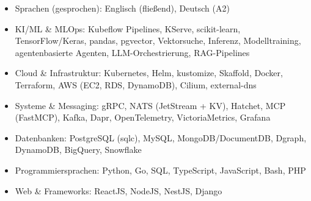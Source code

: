 \documentclass[10pt,a4paper]{resume}
\begin{document}
\begin{itemize}[leftmargin=1.4em,nosep,topsep=2pt]
  \item Sprachen (gesprochen): Englisch (fließend), Deutsch (A2)
  \item KI/ML \& MLOps: Kubeflow Pipelines, KServe, scikit-learn, TensorFlow/Keras, pandas, pgvector, Vektorsuche, Inferenz, Modelltraining, agentenbasierte Agenten, LLM-Orchestrierung, RAG-Pipelines
  \item Cloud \& Infrastruktur: Kubernetes, Helm, kustomize, Skaffold, Docker, Terraform, AWS (EC2, RDS, DynamoDB), Cilium, external-dns
  \item Systeme \& Messaging: gRPC, NATS (JetStream + KV), Hatchet, MCP (FastMCP), Kafka, Dapr, OpenTelemetry, VictoriaMetrics, Grafana
  \item Datenbanken: PostgreSQL (sqlc), MySQL, MongoDB/DocumentDB, Dgraph, DynamoDB, BigQuery, Snowflake
  \item Programmiersprachen: Python, Go, SQL, TypeScript, JavaScript, Bash, PHP
  \item Web \& Frameworks: ReactJS, NodeJS, NestJS, Django
\end{itemize}
\end{document}
